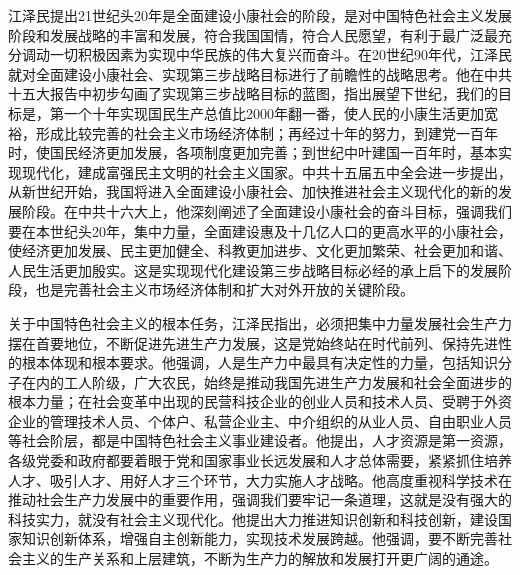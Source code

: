 \documentclass[UTF8, 11pt, oneside]{ctexart}
\begin{document}
江泽民提出21世纪头20年是全面建设小康社会的阶段，是对中国特色社会主义发展阶段和发展战略的丰富和发展，符合我国国情，符合人民愿望，有利于最广泛最充分调动一切积极因素为实现中华民族的伟大复兴而奋斗。在20世纪90年代，江泽民就对全面建设小康社会、实现第三步战略目标进行了前瞻性的战略思考。他在中共十五大报告中初步勾画了实现第三步战略目标的蓝图，指出展望下世纪，我们的目标是，第一个十年实现国民生产总值比2000年翻一番，使人民的小康生活更加宽裕，形成比较完善的社会主义市场经济体制；再经过十年的努力，到建党一百年时，使国民经济更加发展，各项制度更加完善；到世纪中叶建国一百年时，基本实现现代化，建成富强民主文明的社会主义国家。中共十五届五中全会进一步提出，从新世纪开始，我国将进入全面建设小康社会、加快推进社会主义现代化的新的发展阶段。在中共十六大上，他深刻阐述了全面建设小康社会的奋斗目标，强调我们要在本世纪头20年，集中力量，全面建设惠及十几亿人口的更高水平的小康社会，使经济更加发展、民主更加健全、科教更加进步、文化更加繁荣、社会更加和谐、人民生活更加殷实。这是实现现代化建设第三步战略目标必经的承上启下的发展阶段，也是完善社会主义市场经济体制和扩大对外开放的关键阶段。

关于中国特色社会主义的根本任务，江泽民指出，必须把集中力量发展社会生产力摆在首要地位，不断促进先进生产力发展，这是党始终站在时代前列、保持先进性的根本体现和根本要求。他强调，人是生产力中最具有决定性的力量，包括知识分子在内的工人阶级，广大农民，始终是推动我国先进生产力发展和社会全面进步的根本力量；在社会变革中出现的民营科技企业的创业人员和技术人员、受聘于外资企业的管理技术人员、个体户、私营企业主、中介组织的从业人员、自由职业人员等社会阶层，都是中国特色社会主义事业建设者。他提出，人才资源是第一资源，各级党委和政府都要着眼于党和国家事业长远发展和人才总体需要，紧紧抓住培养人才、吸引人才、用好人才三个环节，大力实施人才战略。他高度重视科学技术在推动社会生产力发展中的重要作用，强调我们要牢记一条道理，这就是没有强大的科技实力，就没有社会主义现代化。他提出大力推进知识创新和科技创新，建设国家知识创新体系，增强自主创新能力，实现技术发展跨越。他强调，要不断完善社会主义的生产关系和上层建筑，不断为生产力的解放和发展打开更广阔的通途。
\end{document}
